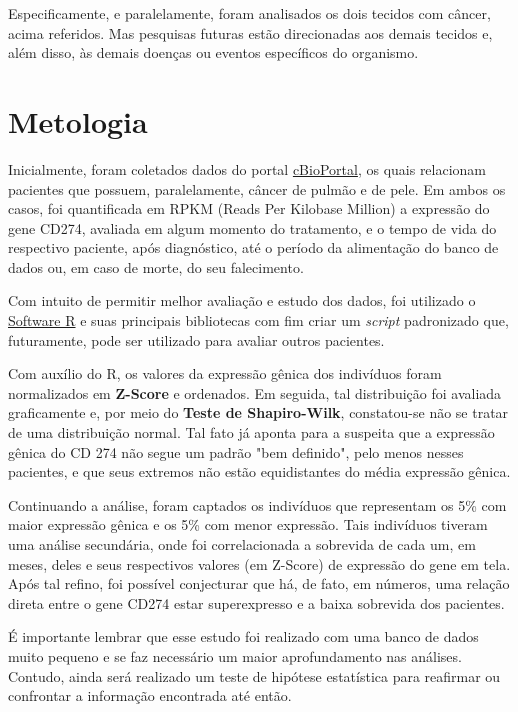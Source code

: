 \documentclass[a4paper,12pt]{article}
\begin{document}
Especificamente, e paralelamente, foram analisados os dois tecidos
com câncer, acima referidos. Mas pesquisas futuras estão direcionadas aos demais tecidos e, além disso,
às demais doenças ou eventos específicos do organismo.

\section{Metologia} \label{sec:firstpage}

Inicialmente, foram coletados dados do portal \href{https://www.cbioportal.org/}{cBioPortal}, os quais
relacionam pacientes que possuem, paralelamente, câncer de pulmão e de pele. Em ambos os casos, foi
quantificada em RPKM (Reads Per Kilobase Million) a expressão do gene CD274, avaliada em algum momento do tratamento, e o tempo de vida do respectivo paciente, após diagnóstico, até o período da alimentação do banco 
de dados ou, em caso de morte, do seu falecimento.

Com intuito de permitir melhor avaliação e estudo dos dados, foi utilizado o \href{https://www.r-project.org/}{Software R} e suas principais bibliotecas com fim criar um \textit{script} padronizado que, futuramente, pode ser utilizado para avaliar outros pacientes.

Com auxílio do R, os valores da expressão gênica dos indivíduos foram normalizados em \textbf{Z-Score} e ordenados. Em seguida, tal distribuição foi avaliada graficamente e, por meio do \textbf{Teste de Shapiro-Wilk}, constatou-se não se tratar de uma distribuição normal. Tal fato já aponta para a suspeita que a expressão gênica do CD 274 não segue um padrão "bem definido", pelo menos nesses pacientes, e que seus extremos não estão equidistantes do média expressão gênica.

Continuando a análise, foram captados os indivíduos que representam os 5\% com maior expressão gênica e os 5\% com menor expressão. Tais indivíduos tiveram uma análise secundária, onde foi correlacionada a sobrevida de cada um, em meses, deles e seus respectivos valores (em Z-Score) de expressão do gene em tela. Após tal refino, foi possível conjecturar que há, de fato, em números, uma relação direta entre o gene CD274 estar superexpresso e a baixa sobrevida dos pacientes.

É importante lembrar que esse estudo foi realizado com uma banco de dados muito pequeno e se faz necessário um maior aprofundamento nas análises. Contudo, ainda será realizado um teste de hipótese estatística para reafirmar ou confrontar a informação encontrada até então.
\end{document}
